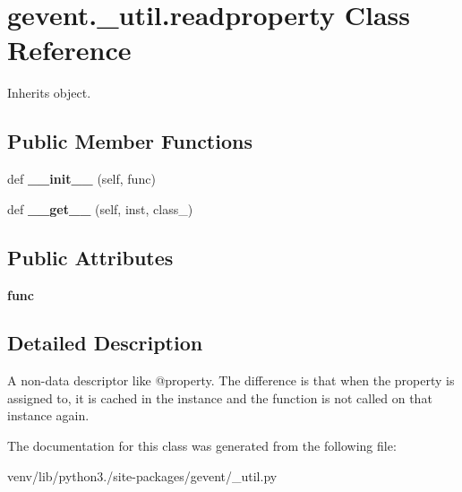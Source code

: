 \hypertarget{classgevent_1_1__util_1_1readproperty}{}\section{gevent.\+\_\+util.\+readproperty Class Reference}
\label{classgevent_1_1__util_1_1readproperty}


Inherits object.

\subsection*{Public Member Functions}
\begin{DoxyCompactItemize}
\item 
\mbox{\label{classgevent_1_1__util_1_1readproperty_af8969fa9413fd8c6bb62f29d500f9f2f}} 
def {\bfseries \+\_\+\+\_\+init\+\_\+\+\_\+} (self, func)
\item 
\mbox{\label{classgevent_1_1__util_1_1readproperty_a4b16577a7a7089bba3a4763a6d985211}} 
def {\bfseries \+\_\+\+\_\+get\+\_\+\+\_\+} (self, inst, class\+\_\+)
\end{DoxyCompactItemize}
\subsection*{Public Attributes}
\begin{DoxyCompactItemize}
\item 
\mbox{\label{classgevent_1_1__util_1_1readproperty_a3bfbceb6807fc179a183a01331e79244}} 
{\bfseries func}
\end{DoxyCompactItemize}


\subsection{Detailed Description}
\begin{DoxyVerb}A non-data descriptor like @property. The difference is that
when the property is assigned to, it is cached in the instance
and the function is not called on that instance again.
\end{DoxyVerb}
 

The documentation for this class was generated from the following file\+:\begin{DoxyCompactItemize}
\item 
venv/lib/python3./site-\/packages/gevent/\+\_\+util.\+py\end{DoxyCompactItemize}
